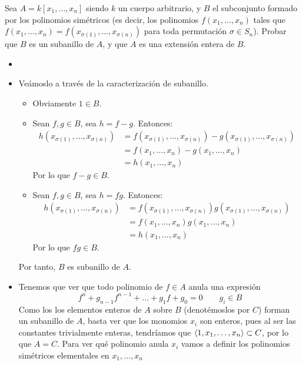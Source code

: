 \documentclass[twoside]{article}
\begin{document}
\newpage
\begin{ejercicio}{6}
Sea $A=k[x_1,\dotsc,x_n]$ siendo $k$ un cuerpo arbitrario, y $B$ el subconjunto formado por los polinomios simétricos (es decir, los polinomios $f(x_1,\dotsc,x_n)$ tales que $f(x_1,\dotsc,x_n)=f(x_{\sigma(1)},\dotsc,x_{\sigma(n)})$ para toda permutación $\sigma \in S_n$). Probar que $B$ es un subanillo de $A$, y que $A$ es una extensión entera de $B$. 
\end{ejercicio}
\begin{solucion}
\begin{itemize}
\item[]
\item Veámoslo a través de la caracterización de subanillo.
\begin{itemize}
\item Obviamente $1\in B$.
\item Sean $f,g\in B$, sea $h=f-g$. Entonces:
\begin{align*}
h(x_{\sigma(1)},\dotsc,x_{\sigma(n)})&=f(x_{\sigma(1)},\dotsc,x_{\sigma(n)})-g(x_{\sigma(1)},\dotsc,x_{\sigma(n)})\\
 &= f(x_1,\dotsc,x_n) - g(x_1,\dotsc,x_n)\\
 &= h(x_1,\dotsc,x_n)
\end{align*}
Por lo que $f-g\in B$.
\item Sean $f,g\in B$, sea $h=fg$. Entonces:
\begin{align*}
h(x_{\sigma(1)},\dotsc,x_{\sigma(n)})&= f(x_{\sigma(1)},\dotsc,x_{\sigma(n)})g(x_{\sigma(1)},\dotsc,x_{\sigma(n)})\\
 &= f(x_1,\dotsc,x_n)g(x_1,\dotsc,x_n)\\
 &= h(x_1,\dotsc,x_n)
\end{align*}
Por lo que $fg\in B$.
\end{itemize}
Por tanto, $B$ es subanillo de $A$.
\item Tenemos que ver que todo polinomio de $f\in A$ anula una expresión
$$
f^n + g_{n-1}f^{n-1}+\dotsc+g_1f+g_0 = 0 \qquad g_i \in B
$$
Como los los elementos enteros de $A$ sobre $B$ (denotémoslos por $C$) forman un subanillo de $A$, basta ver que los monomios $x_i$ son enteros, pues al ser las constantes trivialmente enteras, tendríamos que $\langle{1,x_1,\dotsc,x_n}\rangle\subset C$, por lo que $A=C$. 
\newpage
Para ver qué polinomio anula $x_i$ vamos a definir los polinomios simétricos elementales en $x_1,\dotsc,x_n$


\end{itemize}
\end{solucion}
\end{document}
